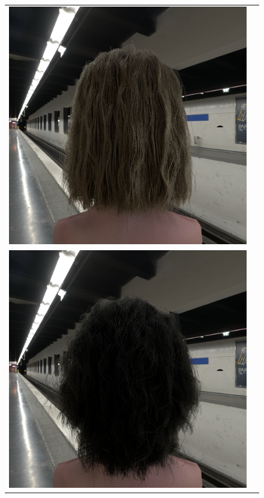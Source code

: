\documentclass[11pt,a4paper]{report}
\begin{document}
\begin{figure}[h]
\begin{center}
\begin{tabular}{cc}
\includegraphics[scale=0.16]{realworld/subway/uniform_blonde1_32.png} \\
\includegraphics[scale=0.16]{realworld/subway/deon_black1_32.png} &

\end{tabular}
\end{center}
\end{figure}
\end{document}
